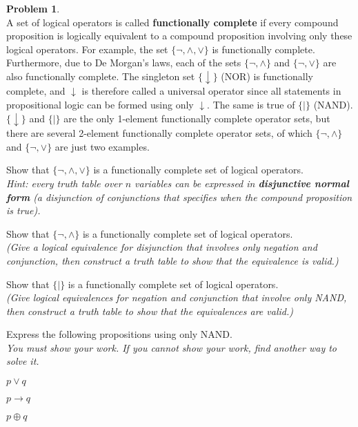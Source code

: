 \documentclass{article}
\theoremstyle{definition}
\newtheorem{problem}{Problem}
\begin{document}
\newpage

\begin{problem}\ \\
A set of logical operators is called {\bf functionally complete} if every compound proposition is logically equivalent to a compound proposition involving only these logical operators.  For example, the set $\{\neg,\wedge,\vee\}$ is functionally complete.  Furthermore, due to De Morgan's laws, each of the sets $\{\neg,\wedge\}$ and $\{\neg,\vee\}$ are also functionally complete.  The singleton set $\{\downarrow\}$ (NOR) is functionally complete, and $\downarrow$ is therefore called a universal operator since all statements in propositional logic can be formed using only $\downarrow$.  The same is true of $\{\mid\}$ (NAND).  $\{\downarrow\}$ and $\{\mid\}$ are the only 1-element functionally complete operator sets, but there are several 2-element functionally complete operator sets, of which $\{\neg,\wedge\}$ and $\{\neg,\vee\}$ are just two examples.
\begin{compactenum}
\item Show that $\{\neg,\wedge,\vee\}$ is a functionally complete set of logical operators.\\
\textit{Hint: every truth table over $n$ variables can be expressed in \textbf{disjunctive normal form} (a disjunction of conjunctions that specifies when the compound proposition is true).}
\item Show that $\{\neg,\wedge\}$ is a functionally complete set of logical operators.\\
\textit{(Give a logical equivalence for disjunction that involves only negation and conjunction, then construct a truth table to show that the equivalence is valid.)}
\item Show that $\{\mid\}$ is a functionally complete set of logical operators.\\
\textit{(Give logical equivalences for negation and conjunction that involve only NAND, then construct a truth table to show that the equivalences are valid.)}
\item Express the following propositions using only NAND.\\
\textit{You must show your work.  If you cannot show your work, find another way to solve it.}
\begin{compactenum}
\item $p \vee q$
\item $p \to q$
\item $p \oplus q$
\end{compactenum}
\end{compactenum}
\end{problem}
\end{document}
